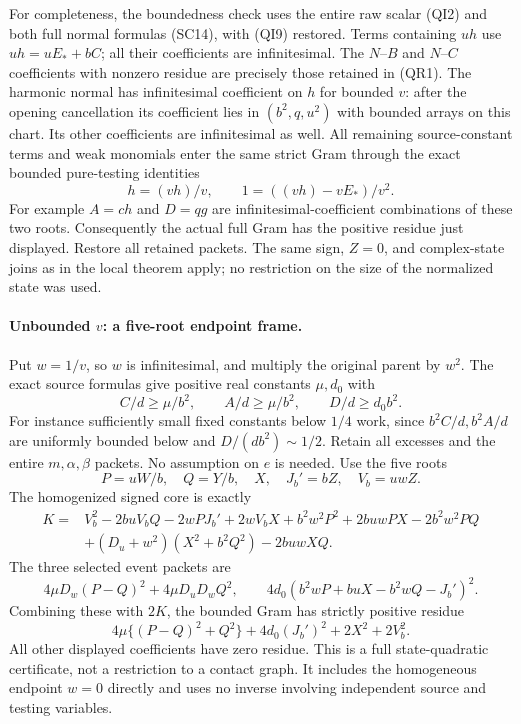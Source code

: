 For completeness, the boundedness check uses the entire raw scalar
(QI2) and both full normal formulas (SC14), with (QI9) restored.
Terms containing $u h$ use $u h=uE_*+bC$; all their coefficients
are infinitesimal. The $N$--$B$ and $N$--$C$ coefficients with
nonzero residue are precisely those retained in (QR1). The harmonic
normal has infinitesimal coefficient on $h$ for bounded $v$:
after the opening cancellation its coefficient lies in
$(b^2,q,u^2)$ with bounded arrays on this chart. Its other
coefficients are infinitesimal as well.
All remaining source-constant terms and weak monomials enter the
same strict Gram through the exact bounded pure-testing identities
\[
                   h=(vh)/v,\qquad
                   1=((vh)-vE_*)/v^2.
\]
For example $A=ch$ and $D=qg$ are infinitesimal-coefficient
combinations of these two roots. Consequently the actual full Gram
has the positive residue just displayed. Restore all retained
packets. The same sign, $Z=0$, and complex-state joins as in the
local theorem apply; no restriction on the size of the normalized
state was used.

\paragraph{Unbounded $v$: a five-root endpoint frame.}
Put $w=1/v$, so $w$ is infinitesimal, and multiply the original
parent by $w^2$. The exact source formulas give positive real
constants $\mu,d_0$ with
\[
 C/d\ge\mu/b^2,\qquad A/d\ge\mu/b^2,\qquad
 D/d\ge d_0 b^2.
\]
For instance sufficiently small fixed constants below $1/4$ work,
since $b^2C/d,b^2A/d$ are uniformly bounded below and
$D/(db^2)\sim1/2$. Retain all excesses and the entire $m,\alpha,
\beta$ packets. No assumption on $e$ is needed.
Use the five roots
\[
              P=uW/b,\quad Q=Y/b,\quad X,\quad J_b'=bZ,
                     \quad V_b=uwZ.
\]
The homogenized signed core is exactly
\begin{align*}
 K={}&V_b^2-2buV_bQ-2wPJ_b'+2wV_bX+b^2w^2P^2
       +2buwPX-2b^2w^2PQ\\
 &+(D_u+w^2)(X^2+b^2Q^2)-2buwXQ.
 \tag{QR2}
\end{align*}
The three selected event packets are
\[
 4\mu D_w(P-Q)^2+4\mu D_uD_wQ^2,
 \qquad
 4d_0(b^2wP+buX-b^2wQ-J_b')^2.
 \tag{QR3}
\]
Combining these with $2K$, the bounded Gram has strictly positive
residue
\[
 4\mu\{(P-Q)^2+Q^2\}+4d_0(J_b')^2+2X^2+2V_b^2.
\]
All other displayed coefficients have zero residue. This is a full
state-quadratic certificate, not a restriction to a contact graph.
It includes the homogeneous endpoint $w=0$ directly and uses no
inverse involving independent source and testing variables.

